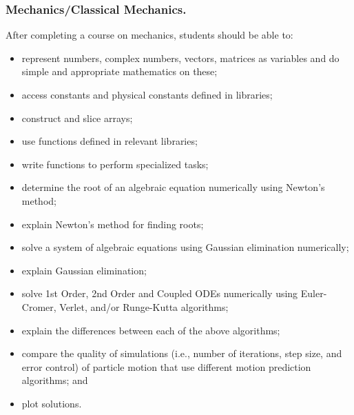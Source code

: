 \documentclass[graybox,envcountchap,sectrefs]{svmult}
\begin{document}
\subsubsection{Mechanics/Classical Mechanics.}
After completing a course on mechanics, students should be able to:
\begin{itemize}
\item represent numbers, complex numbers, vectors, matrices as variables and do simple and appropriate mathematics on these;

\item access constants and physical constants defined in libraries;

\item construct and slice arrays;

\item use functions defined in relevant libraries;

\item write functions to perform specialized tasks;

\item determine the root of an algebraic equation numerically using Newton's method;

\item explain Newton's method for finding roots;

\item solve a system of algebraic equations using Gaussian elimination numerically;

\item explain Gaussian elimination;

\item solve 1st Order, 2nd Order and Coupled ODEs numerically using Euler-Cromer, Verlet, and/or Runge-Kutta algorithms;

\item explain the differences between each of the above algorithms;

\item compare the quality of simulations (i.e., number of iterations, step size, and error control) of particle motion that use different motion prediction algorithms; and

\item plot solutions.
\end{itemize}
\end{document}
